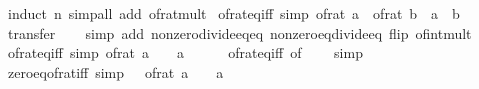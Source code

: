 \begin{isabellebody}
\ {\isacharparenleft}{\kern0pt}induct\ n{\isacharparenright}{\kern0pt}\ {\isacharparenleft}{\kern0pt}simp{\isacharunderscore}{\kern0pt}all\ add{\isacharcolon}{\kern0pt}\ of{\isacharunderscore}{\kern0pt}rat{\isacharunderscore}{\kern0pt}mult{\isacharparenright}{\kern0pt}%
\endisatagproof
{\isafoldproof}%
%
\isadelimproof
\isanewline
%
\endisadelimproof
\isanewline
{}\isamarkupfalse%
\ of{\isacharunderscore}{\kern0pt}rat{\isacharunderscore}{\kern0pt}eq{\isacharunderscore}{\kern0pt}iff\ {\isacharbrackleft}{\kern0pt}simp{\isacharbrackright}{\kern0pt}{\isacharcolon}{\kern0pt}\ {\isachardoublequoteopen}of{\isacharunderscore}{\kern0pt}rat\ a\ {\isacharequal}{\kern0pt}\ of{\isacharunderscore}{\kern0pt}rat\ b\ {\isasymlongleftrightarrow}\ a\ {\isacharequal}{\kern0pt}\ b{\isachardoublequoteclose}\isanewline
%
\isadelimproof
\ \ %
\endisadelimproof
%
\isatagproof
{}\isamarkupfalse%
\ transfer\isanewline
\ \ \isamarkupfalse%
\ {\isacharparenleft}{\kern0pt}simp\ add{\isacharcolon}{\kern0pt}\ nonzero{\isacharunderscore}{\kern0pt}divide{\isacharunderscore}{\kern0pt}eq{\isacharunderscore}{\kern0pt}eq\ nonzero{\isacharunderscore}{\kern0pt}eq{\isacharunderscore}{\kern0pt}divide{\isacharunderscore}{\kern0pt}eq\ flip{\isacharcolon}{\kern0pt}\ of{\isacharunderscore}{\kern0pt}int{\isacharunderscore}{\kern0pt}mult{\isacharparenright}{\kern0pt}\isanewline
\ \ \isamarkupfalse%
%
\endisatagproof
{\isafoldproof}%
%
\isadelimproof
\isanewline
%
\endisadelimproof
\isanewline
{}\isamarkupfalse%
\ of{\isacharunderscore}{\kern0pt}rat{\isacharunderscore}{\kern0pt}eq{\isacharunderscore}{\kern0pt}{}{\isacharunderscore}{\kern0pt}iff\ {\isacharbrackleft}{\kern0pt}simp{\isacharbrackright}{\kern0pt}{\isacharcolon}{\kern0pt}\ {\isachardoublequoteopen}of{\isacharunderscore}{\kern0pt}rat\ a\ {\isacharequal}{\kern0pt}\ {}\ {\isasymlongleftrightarrow}\ a\ {\isacharequal}{\kern0pt}\ {}{\isachardoublequoteclose}\isanewline
%
\isadelimproof
\ \ %
\endisadelimproof
%
\isatagproof
{}\isamarkupfalse%
\ of{\isacharunderscore}{\kern0pt}rat{\isacharunderscore}{\kern0pt}eq{\isacharunderscore}{\kern0pt}iff\ {\isacharbrackleft}{\kern0pt}of\ {\isacharunderscore}{\kern0pt}\ {}{\isacharbrackright}{\kern0pt}\ \isamarkupfalse%
\ simp%
\endisatagproof
{\isafoldproof}%
%
\isadelimproof
\isanewline
%
\endisadelimproof
\isanewline
{}\isamarkupfalse%
\ zero{\isacharunderscore}{\kern0pt}eq{\isacharunderscore}{\kern0pt}of{\isacharunderscore}{\kern0pt}rat{\isacharunderscore}{\kern0pt}iff\ {\isacharbrackleft}{\kern0pt}simp{\isacharbrackright}{\kern0pt}{\isacharcolon}{\kern0pt}\ {\isachardoublequoteopen}{}\ {\isacharequal}{\kern0pt}\ of{\isacharunderscore}{\kern0pt}rat\ a\ {\isasymlongleftrightarrow}\ {}\ {\isacharequal}{\kern0pt}\ a{\isachardoublequoteclose}\isanewline

\end{isabellebody}

